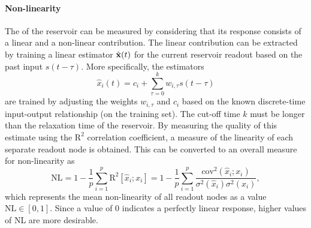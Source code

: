 \paragraph{Non-linearity}
The  of the reservoir can be measured by considering that its response consists of a linear and a non-linear contribution.
The linear contribution can be extracted by training a linear estimator $\hat{\boldsymbol{\mathbf{x}}}(t)$ for the current reservoir readout based on the past input $s(t - \tau)$.
More specifically, the estimators
\begin{equation}
	\hat{x}_i(t) = c_i + \sum_{\tau=0}^{k} w_{i,\tau} s(t - \tau)
\end{equation}
are trained by adjusting the weights $w_{i,\tau}$ and $c_i$ based on the known discrete-time input-output relationship (on the training set).
The cut-off time $k$ must be longer than the relaxation time of the reservoir.
By measuring the quality of this estimate using the $\mathrm{R}^2$ correlation coefficient, a measure of the linearity of each separate readout node is obtained.
This can be converted to an overall measure for non-linearity as
\begin{equation}
	\mathrm{NL} = 1 - \frac{1}{p} \sum_{i=1}^p \mathrm{R}^2[\hat{x}_i;x_i] = 1 - \frac{1}{p} \sum_{i=1}^p \frac{\mathrm{cov}^2(\hat{x}_i; x_i)}{\sigma^2(\hat{x}_i) \sigma^2(x_i)} \mathrm{,}
\end{equation}
which represents the mean non-linearity of all readout nodes as a value $\mathrm{NL} \in [0,1]$.
Since a value of 0 indicates a perfectly linear response, higher values of NL are more desirable.


